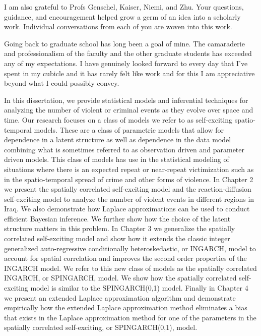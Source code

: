 \documentclass[11pt]{isuthesis}
\begin{document}
I am also grateful to Profs Genschel, Kaiser, Niemi, and Zhu.  Your questions, guidance, and encouragement helped grow a germ of an idea into a scholarly work.  Individual conversations from each of you are woven into this work.

Going back to graduate school has long been a goal of mine.  The camaraderie and professionalism of the faculty and the other graduate students has exceeded any of my expectations.  I have genuinely looked forward to every day that I've spent in my cubicle and it has rarely felt like work and for this I am appreciative beyond what I could possibly convey.
\cleardoublepage {}
{}

In this dissertation, we provide statistical models and inferential techniques for analyzing the number of violent or criminal events as they evolve over space and time.  Our research focuses on a class of models we refer to as self-exciting spatio-temporal models.  These are a class of parametric models that allow for dependence in a latent structure as well as dependence in the data model combining what is sometimes referred to as observation driven and parameter driven models.  This class of models has use in the statistical modeling of situations where there is an expected repeat or near-repeat victimization such as in the spatio-temporal spread of crime and other forms of violence. In Chapter 2 we present the spatially correlated self-exciting model and the reaction-diffusion self-exciting model to analyze the number of violent events in different regions in Iraq.  We also demonstrate how Laplace approximations can be used to conduct efficient Bayesian inference.  We further show how the choice of the latent structure matters in this problem.  In Chapter 3 we generalize the spatially correlated self-exciting model and show how it extends the classic integer generalized auto-regressive conditionally heteroskedastic, or INGARCH, model to account for spatial correlation and improves the second order properties of the INGARCH model.  We refer to this new class of models as the spatially correlated INGARCH, or SPINGARCH, model.  We show how the spatially correlated self-exciting model is similar to the SPINGARCH(0,1) model.  Finally in Chapter 4 we present an extended Laplace approximation algorithm and demonstrate empirically how the extended Laplace approximation method eliminates a bias that exists in the Laplace approximation method for one of the parameters in the spatially correlated self-exciting, or SPINGARCH(0,1), model. 
\newpage
{}
\end{document}

